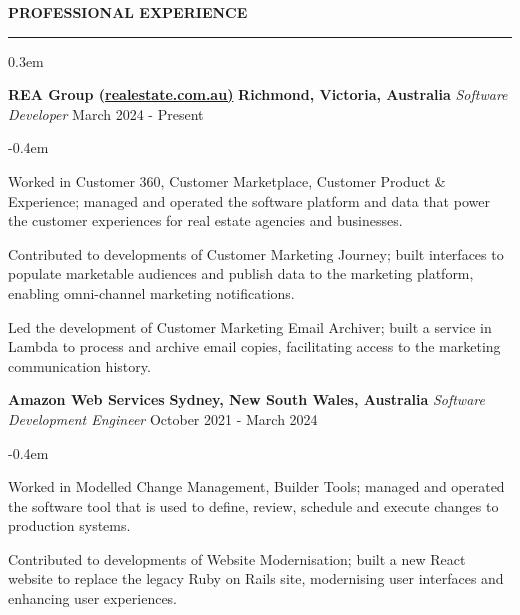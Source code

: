 \documentclass{cv}
\begin{document}
\textbf{\uppercase{Professional Experience}}
\sectionlineskip
\hrule height 0.1em
\begin{list}{}{\setlength{\leftmargin}{0em}}
\itemsep 0.3em
\item
    \textbf{REA Group (\href{https://realestate.com.au/}{realestate.com.au)}} \hfill \textbf{Richmond, Victoria, Australia}%
    \vspace{0.1em} \newline 
    {\textit{Software Developer}} \hfill {March 2024 - Present}%
    \begin{list}{\raisebox{0.2em}{\tiny$\bullet$} \hspace{0em}}{\setlength{\leftmargin}{1.2em}}
        \itemsep -0.4em \vspace{-0.4em}
        \item Worked in Customer 360, Customer Marketplace, Customer Product \& Experience; managed and operated the software platform and data that power the customer experiences for real estate agencies and businesses.
        \item Contributed to developments of Customer Marketing Journey; built interfaces to populate marketable audiences and publish data to the marketing platform, enabling omni-channel marketing notifications.
        \item Led the development of Customer Marketing Email Archiver; built a service in Lambda to process and archive email copies, facilitating access to the marketing communication history.
    \end{list}
\item 
    \textbf{Amazon Web Services} \hfill \textbf{Sydney, New South Wales, Australia}%
    \vspace{0.1em} \newline 
    {\textit{Software Development Engineer}} \hfill {October 2021 - March 2024}%
    \begin{list}{\raisebox{0.2em}{\tiny$\bullet$} \hspace{0em}}{\setlength{\leftmargin}{1.2em}}
        \itemsep -0.4em \vspace{-0.4em}
        \item Worked in Modelled Change Management, Builder Tools; managed and operated the software tool that is used to define, review, schedule and execute changes to production systems.
        \item Contributed to developments of Website Modernisation; built a new React website to replace the legacy Ruby on Rails site, modernising user interfaces and enhancing user experiences.

\end{list}
\end{list}
\end{document}
